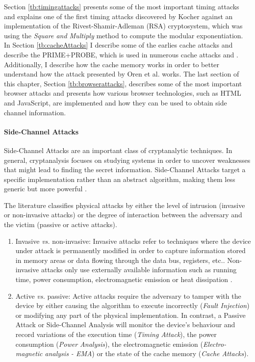 \documentclass[10pt,a4paper,twoside]{book}
\begin{document}
Section \ref{tb:timingattacks} presents some of the most important timing attacks and explains one of the first timing attacks discovered by Kocher\cite{kocher1996timing} against an implementation of the Rivest-Shamir-Adleman (RSA) \cite{rivest1978method} cryptosystem, which was using the \textit{Square and Multiply}\cite{menezes1996handbook} method to compute the modular exponentiation. In Section \ref{tb:cacheAttacks} I describe some of the earlies cache attacks and describe the PRIME+PROBE\cite{osvik2006cache}, which is used in numerous cache attacks \cite{osvik2006cache} and \cite{oren2015spy}. Additionally, I describe how the cache memory works in order to better understand how the attack presented by Oren et al.\cite{oren2015spy} works. The last section of this chapter, Section \ref{tb:browserattacks}, describes some of the most important browser attacks and presents how various browser technologies, such as HTML and JavaScript, are implemented and how they can be used to obtain side channel information.

\paragraph{Side-Channel Attacks}

Side-Channel Attacks are an important class of cryptanalytic techniques. In general, cryptanalysis focuses on studying systems in order to uncover weaknesses that might lead to finding the secret information. Side-Channel Attacks target a specific implementation rather than an abstract algorithm, making them less generic but more powerful \cite{standaert2010introduction}.

The literature classifies physical attacks by either the level of intrusion (invasive or non-invasive attacks) or the degree of interaction between the adversary and the victim (passive or active attacks).
\begin{enumerate}
\item Invasive \textit{vs.} non-invasive: Invasive attacks refer to techniques where the device under attack is permanently modified in order to capture information stored in memory areas or data flowing through the data bus, registers, etc.\cite{Tria2011}. Non-invasive attacks only use externally available information such as running time, power consumption, electromagnetic emission or heat dissipation \cite{standaert2010introduction}.
\item Active \textit{vs.} passive: Active attacks require the adversary to tamper with the device by either causing the algorithm to execute incorrectly (\textit{Fault Injection}) or modifying any part of the physical implementation. In contrast, a Passive Attack or Side-Channel Analysis will monitor the device's behaviour and record variations of the execution time (\textit{Timing Attack}), the power consumption (\textit{Power Analysis}), the electromagnetic emission (\textit{Electro-magnetic analysis - EMA}) or the state of the cache memory (\textit{Cache Attacks}).
\end{enumerate}
\end{document}
